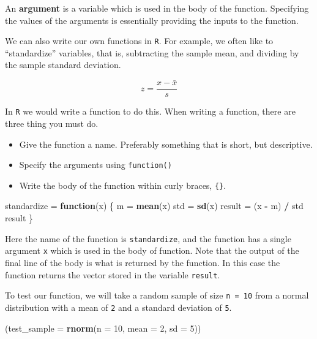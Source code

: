 \documentclass[]{book}
\newenvironment{Shaded}{\begin{snugshade}}{\end{snugshade}}
\newcommand{\KeywordTok}[1]{\textcolor[rgb]{0.13,0.29,0.53}{\textbf{#1}}}
\newcommand{\DataTypeTok}[1]{\textcolor[rgb]{0.13,0.29,0.53}{#1}}
\newcommand{\DecValTok}[1]{\textcolor[rgb]{0.00,0.00,0.81}{#1}}
\newcommand{\StringTok}[1]{\textcolor[rgb]{0.31,0.60,0.02}{#1}}
\newcommand{\ControlFlowTok}[1]{\textcolor[rgb]{0.13,0.29,0.53}{\textbf{#1}}}
\newcommand{\OperatorTok}[1]{\textcolor[rgb]{0.81,0.36,0.00}{\textbf{#1}}}
\newcommand{\NormalTok}[1]{#1}
\providecommand{\tightlist}{%
  \setlength{\itemsep}{0pt}\setlength{\parskip}{0pt}}
\theoremstyle{definition}
\theoremstyle{definition}
\theoremstyle{definition}
\theoremstyle{remark}
\begin{document}
An \textbf{argument} is a variable which is used in the body of the
function. Specifying the values of the arguments is essentially
providing the inputs to the function.

We can also write our own functions in \texttt{R}. For example, we often
like to ``standardize'' variables, that is, subtracting the sample mean,
and dividing by the sample standard deviation.

\[
z = \frac{x - \bar{x}}{s}
\]

In \texttt{R} we would write a function to do this. When writing a
function, there are three thing you must do.

\begin{itemize}
\tightlist
\item
  Give the function a name. Preferably something that is short, but
  descriptive.
\item
  Specify the arguments using \texttt{function()}
\item
  Write the body of the function within curly braces, \texttt{\{\}}.
\end{itemize}

\begin{Shaded}
\begin{Highlighting}[]
\NormalTok{standardize =}\StringTok{ }\ControlFlowTok{function}\NormalTok{(x) \{}
\NormalTok{  m =}\StringTok{ }\KeywordTok{mean}\NormalTok{(x)}
\NormalTok{  std =}\StringTok{ }\KeywordTok{sd}\NormalTok{(x)}
\NormalTok{  result =}\StringTok{ }\NormalTok{(x }\OperatorTok{-}\StringTok{ }\NormalTok{m) }\OperatorTok{/}\StringTok{ }\NormalTok{std}
\NormalTok{  result}
\NormalTok{\}}
\end{Highlighting}
\end{Shaded}

Here the name of the function is \texttt{standardize}, and the function
has a single argument \texttt{x} which is used in the body of function.
Note that the output of the final line of the body is what is returned
by the function. In this case the function returns the vector stored in
the variable \texttt{result}.

To test our function, we will take a random sample of size
\texttt{n\ =\ 10} from a normal distribution with a mean of \texttt{2}
and a standard deviation of \texttt{5}.

\begin{Shaded}
\begin{Highlighting}[]
\NormalTok{(}\DataTypeTok{test_sample =} \KeywordTok{rnorm}\NormalTok{(}\DataTypeTok{n =} \DecValTok{10}\NormalTok{, }\DataTypeTok{mean =} \DecValTok{2}\NormalTok{, }\DataTypeTok{sd =} \DecValTok{5}\NormalTok{))}
\end{Highlighting}
\end{Shaded}
\end{document}
